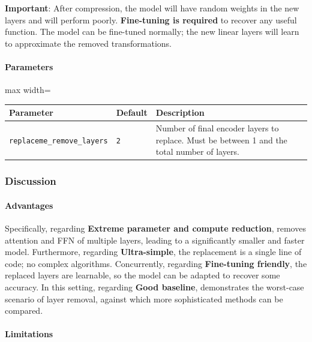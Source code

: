 \textbf{Important}: After compression, the model will have random weights in the new layers and will perform poorly. \textbf{Fine-tuning is required} to recover any useful function. The model can be fine-tuned normally; the new linear layers will learn to approximate the removed transformations.

\paragraph{Parameters}

\begin{center}
\begin{adjustbox}{max width=\columnwidth}
\renewcommand{\arraystretch}{1.2}
\begin{tabular}{lll}
\toprule
Parameter & Default & Description \\
\midrule
\texttt{replaceme\_remove\_layers} & \texttt{2} & Number of final encoder layers to replace. Must be between 1 and the total number of layers. \\

\bottomrule
\end{tabular}
\end{adjustbox}
\end{center}

\subsubsection*{Discussion}

\paragraph{Advantages}

Specifically, regarding \textbf{Extreme parameter and compute reduction}, removes attention and FFN of multiple layers, leading to a significantly smaller and faster model. Furthermore, regarding \textbf{Ultra-simple}, the replacement is a single line of code; no complex algorithms. Concurrently, regarding \textbf{Fine-tuning friendly}, the replaced layers are learnable, so the model can be adapted to recover some accuracy. In this setting, regarding \textbf{Good baseline}, demonstrates the worst-case scenario of layer removal, against which more sophisticated methods can be compared.


\paragraph{Limitations}

